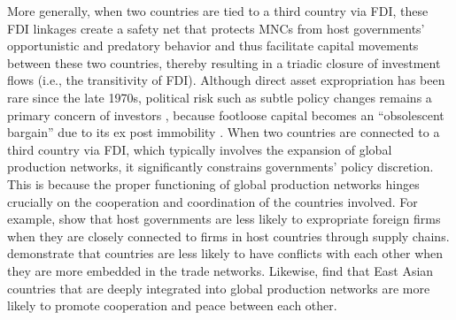 \documentclass[reqno,onecolumn,letterpaper,12pt]{article}
\begin{document}
More generally, when two countries are tied to a third country via FDI, these FDI linkages create a safety net that protects MNCs from host governments' opportunistic and predatory behavior and thus facilitate capital movements between these two countries, thereby resulting in a triadic closure of investment flows (i.e., the transitivity of FDI). Although direct asset expropriation has been rare since the late 1970s, political risk such as subtle policy changes remains a primary concern of investors \citep{Graham_et_al:2018}, because footloose capital becomes an ``obsolescent bargain'' due to its ex post immobility \citep{Vernon:1971,Vernon:1980}. When two countries are connected to a third country via FDI, which typically involves the expansion of global production networks, it significantly constrains governments' policy discretion. This is because the proper functioning of global production networks hinges crucially on the cooperation and coordination of the countries involved. %
For example, \citet{johns2016under} show that host governments are less likely to expropriate foreign firms when they are closely connected to firms in host countries through supply chains. \citet{Dorussen_Ward:2010} demonstrate that countries are less likely to have conflicts with each other when they are more embedded in the trade networks. Likewise, \citet{Kim_Solingen:2017} find that East Asian countries that are deeply integrated into global production networks are more likely to promote cooperation and peace between each other.

\end{document}
